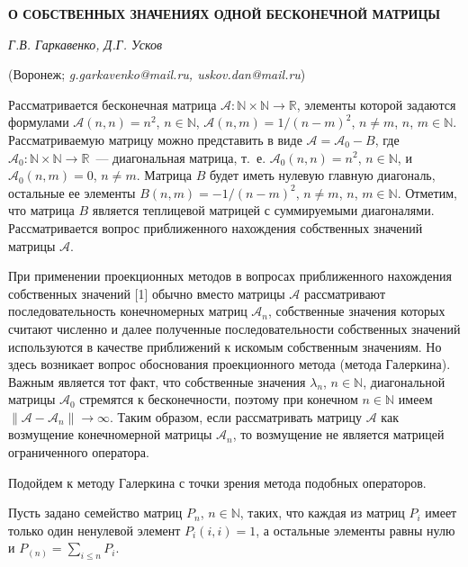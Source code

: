 \begin{center}
    {\bf О СОБСТВЕННЫХ ЗНАЧЕНИЯХ ОДНОЙ БЕСКОНЕЧНОЙ МАТРИЦЫ}

    {\it Г.В. Гаркавенко, Д.Г. Усков}

    (Воронеж; {\it g.garkavenko@mail.ru, uskov.dan@mail.ru})
\end{center}


Рассматривается бесконечная матрица $\mathcal{A}: \mathbb{N}\times\mathbb{N}\to\mathbb{R}$, элементы которой задаются
формулами $\mathcal{A}(n, n)=n^2$, $n\in\mathbb{N}$, $\mathcal{A}(n, m)=1/(n-m)^2$, $n\ne m$, $n$, $m\in\mathbb{N}$.
Рассматриваемую матрицу
можно представить в виде $\mathcal{A}=\mathcal{A}_0-B$, где $\mathcal{A}_0: \mathbb{N}\times\mathbb{N}\to\mathbb{R}$~---
диагональная матрица, т.~е. $\mathcal{A}_0(n, n)=n^2$, $n\in\mathbb{N}$, и $\mathcal{A}_0(n, m)=0$, $n\ne m$. Матрица
$B$ будет иметь нулевую главную диагональ, остальные ее элементы $B(n, m)=-1/(n-m)^2$, $n\ne m$, $n$, $m\in\mathbb{N}$.
Отметим, что матрица $B$ является теплицевой матрицей с суммируемыми диагоналями. Рассматривается вопрос приближенного
нахождения собственных значений матрицы $\mathcal{A}$.

При применении проекционных методов в вопросах приближенного нахождения собственных значений [1] обычно вместо
матрицы $\mathcal{A}$ рассматривают последовательность конечномерных матриц $\mathcal{A}_n$, собственные значения которых \linebreak
считают численно и далее полученные последовательности собственных значений используются в качестве приближений к искомым
собственным значениям. Но здесь возникает вопрос обоснования проекционного метода (метода Галеркина). Важным является тот факт, что
собственные значения $\lambda_n$, $n\in\mathbb{N}$, диагональной матрицы $\mathcal{A}_0$ стремятся к бесконечности, поэтому
при конечном $n\in\mathbb{N}$ имеем $\|\mathcal{A}-\mathcal{A}_n\|\to\infty$. Таким образом, если рассматривать матрицу $\mathcal{A}$
как возмущение конечномерной матрицы $\mathcal{A}_n$, то возмущение не является матрицей ограниченного оператора.

Подойдем к методу Галеркина с точки зрения метода подобных операторов.

Пусть задано семейство матриц $P_n$, $n\in\mathbb{N}$, таких, что каждая из матриц $P_i$ имеет только один ненулевой элемент
$P_i(i, i)=1$, а остальные элементы равны нулю и $P_{(n)}=\sum_{i\leqslant n}P_i$.


